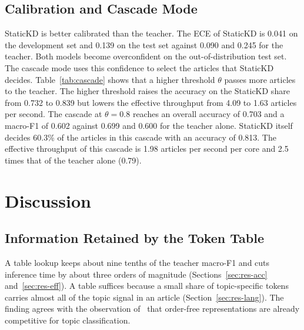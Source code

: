 \documentclass{ieeeaccess}
\begin{document}
\subsection{Calibration and Cascade Mode}
\begin{table}[!t]
\caption{Cascade of StaticKD and the ONNX Int8 Teacher on the Test Set}
\label{tab:cascade}
\centering
\footnotesize
\setlength{\tabcolsep}{2.5pt}
\end{table}
StaticKD is better calibrated than the teacher. The ECE of StaticKD is 0.041 on the development set and 0.139 on the test set against 0.090 and 0.245 for the teacher. Both models become overconfident on the out-of-distribution test set. The cascade mode uses this confidence to select the articles that StaticKD decides. Table~\ref{tab:cascade} shows that a higher threshold $\theta$ passes more articles to the teacher. The higher threshold raises the accuracy on the StaticKD share from 0.732 to 0.839 but lowers the effective throughput from 4.09 to 1.63 articles per second. The cascade at $\theta=0.8$ reaches an overall accuracy of 0.703 and a macro-F1 of 0.602 against 0.699 and 0.600 for the teacher alone. StaticKD itself decides 60.3\% of the articles in this cascade with an accuracy of 0.813. The effective throughput of this cascade is 1.98 articles per second per core and 2.5 times that of the teacher alone (0.79).

\section{Discussion}
\label{sec:discussion}
\subsection{Information Retained by the Token Table}
A table lookup keeps about nine tenths of the teacher macro-F1 and cuts inference time by about three orders of magnitude (Sections~\ref{sec:res-acc} and~\ref{sec:res-eff}). A table suffices because a small share of topic-specific tokens carries almost all of the topic signal in an article (Section~\ref{sec:res-lang}). The finding agrees with the observation of~\cite{galke2022bow} that order-free representations are already competitive for topic classification.
\end{document}
